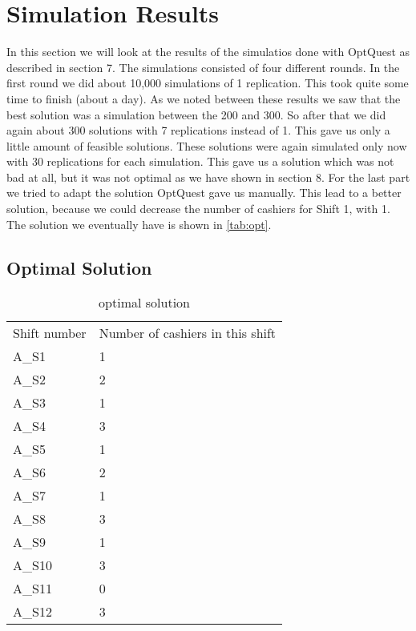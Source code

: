 \section{Simulation Results}
In this section we will look at the results of the simulatios done with OptQuest as described in section 7. 
The simulations consisted of four different rounds. 
In the first round we did about 10,000 simulations of 1 replication. 
This took quite some time to finish (about a day).
As we noted between these results we saw that the best solution was a simulation between the 200 and 300.
So after that we did again about 300 solutions with 7 replications instead of 1.
This gave us only a little amount of feasible solutions. 
These solutions were again simulated only now with 30 replications for each simulation.
This gave us a solution which was not bad at all, but it was not optimal as we have shown in section 8.
For the last part we tried to adapt the solution OptQuest gave us manually.
This lead to a better solution, because we could decrease the number of cashiers for Shift 1, with 1.
The solution we eventually have is shown in \autoref{tab:opt}.

\subsection{Optimal Solution}
\begin{table}
	\centering
	\caption{optimal solution}
	\begin{tabular}{l | l}
		Shift number & Number of cashiers in this shift\\
		A\_S1 & 1 \\
		A\_S2 & 2 \\
		A\_S3 & 1 \\
		A\_S4 & 3 \\
		A\_S5 & 1 \\
		A\_S6 & 2 \\
		A\_S7 & 1 \\
		A\_S8 & 3 \\
		A\_S9 & 1 \\
		A\_S10 & 3 \\
		A\_S11 & 0 \\
		A\_S12 & 3 \\
	\end{tabular}
	\label{tab:opt}
\end{table}

\newcommand{\cc}{\cellcolor{cyan}}

